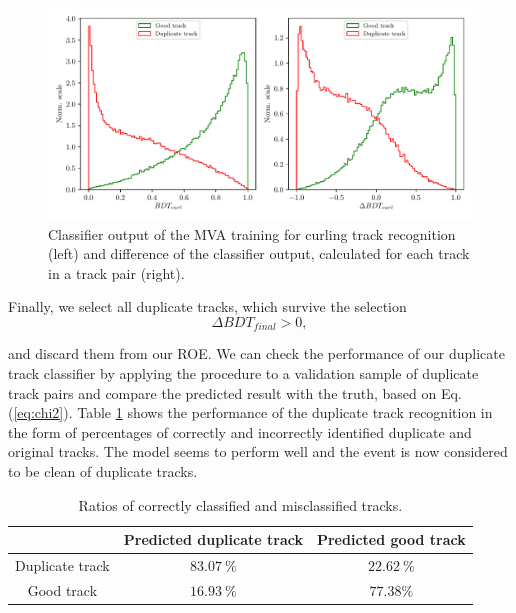 \begin{figure}[H]
	\centering
	\captionsetup{width=0.8\linewidth}
	\includegraphics[width=\linewidth]{fig/ROECleanup_curl}
	\caption{Classifier output of the MVA training for curling track recognition (left) and difference of the classifier output, calculated for each track in a track pair (right).}
	\label{fig:ROE_curl}
\end{figure}

Finally, we select all duplicate tracks, which survive the selection 
\begin{equation}
\Delta BDT_{final} > 0,
\end{equation}

and discard them from our ROE. We can check the performance of our duplicate track classifier by applying the procedure to a validation sample of duplicate track pairs and compare the predicted result with the truth, based on Eq. (\ref{eq:chi2}). Table \ref{tab:rat} shows the performance of the duplicate track recognition in the form of percentages of correctly and incorrectly identified duplicate and original tracks. The model seems to perform well and the event is now considered to be clean of duplicate tracks.

\begin{table}[H]
	\centering
	\begin{tabular}{c|c|c}
		& Predicted duplicate track & Predicted good track \\
		\toprule
		Duplicate track & $83.07~\%$  & $22.62~\%$  \\
		Good track & $16.93~\%$ & $77.38\%$ \\
		\bottomrule
	\end{tabular}
	\captionsetup{width=.8\linewidth}
	\caption{Ratios of correctly classified and misclassified tracks.}
	\label{tab:rat}
\end{table}

